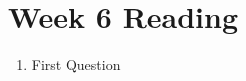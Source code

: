 \documentclass[a4paper, 10pt]{article}
\begin{document}




\section{Week 6 Reading}
\begin{enumerate}
    \item First Question
\end{enumerate}
\end{document}
